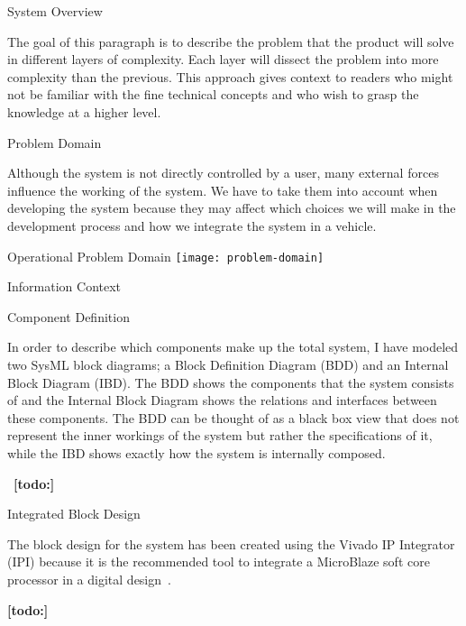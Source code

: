 \documentclass{matthijs}
\begin{document}
	\begin{hoofdstuk}{System Overview}

		The goal of this paragraph is to describe the problem that the product will solve in different layers of complexity.
		Each layer will dissect the problem into more complexity than the previous.
		This approach gives context to readers who might not be familiar with the fine technical concepts and who wish to grasp the knowledge at a higher level.

		\begin{paragraaf}{Problem Domain}

			Although the system is not directly controlled by a user, many external forces influence the working of the system.
			We have to take them into account when developing the system because they may affect which choices we will make in the development process and how we integrate the system in a vehicle.

			\begin{figuur}{Operational Problem Domain}
				\singlespacing
				\texttt{[image: problem-domain]}
				\onehalfspacing
			\end{figuur}

		\end{paragraaf}

		\begin{paragraaf}{Information Context}

		\end{paragraaf}

		\begin{paragraaf}{Component Definition}

			In order to describe which components make up the total system, I have modeled two SysML block diagrams; a Block Definition Diagram (BDD) and an Internal Block Diagram (IBD).
			The BDD shows the components that the system consists of and the Internal Block Diagram shows the relations and interfaces between these components.
			The BDD can be thought of as a black box view that does not represent the inner workings of the system but rather the specifications of it, while the IBD shows exactly how the system is internally composed.
		\end{paragraaf}

		\
		\textbf{[todo:]}

	\end{hoofdstuk}

	\begin{hoofdstuk}{Integrated Block Design}

		The block design for the system has been created using the Vivado IP Integrator (IPI) because it is the recommended tool to integrate a MicroBlaze soft core processor in a digital design~\cite{xilinxug994}.

		\textbf{[todo:]}

	\end{hoofdstuk}
\end{document}
